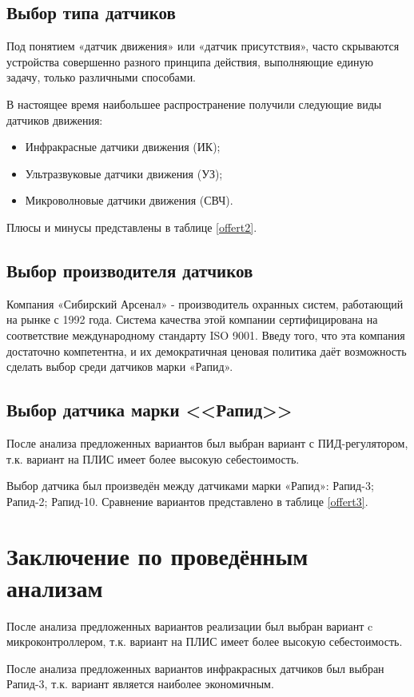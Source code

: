 		\subsection{Выбор типа датчиков}
			Под понятием «датчик движения» или «датчик присутствия», часто скрываются устройства совершенно разного принципа действия, выполняющие единую задачу, только различными способами.

			В настоящее время наибольшее распространение получили следующие виды датчиков движения:
			\begin{itemize}
\changefontsizes[14pt]{14pt}
				\item Инфракрасные датчики движения (ИК);
				\item Ультразвуковые датчики движения (УЗ);
				\item Микроволновые датчики движения (СВЧ).
			\end{itemize}
			Плюсы и минусы представлены в таблице \ref{offert2}.
			
		\subsection{Выбор производителя датчиков}
			Компания «Сибирский Арсенал» - производитель охранных систем, работающий на рынке с 1992 года. Система качества этой компании сертифицирована на соответствие международному стандарту ISO 9001.
			Введу того, что эта компания достаточно компетентна, и их демократичная ценовая политика даёт возможность сделать выбор среди датчиков марки «Рапид».
		\subsection{Выбор датчика марки <<Рапид>>}
			После анализа предложенных вариантов был выбран вариант с ПИД-регулятором, т.к. вариант на ПЛИС имеет более высокую себестоимость.

			Выбор датчика был произведён между датчиками марки «Рапид»: Рапид-3; Рапид-2; Рапид-10. Сравнение вариантов представлено в таблице \ref{offert3}.
			
	\section{Заключение по проведённым анализам}
		После анализа предложенных вариантов реализации был выбран вариант c микроконтроллером, т.к. вариант на ПЛИС имеет более высокую себестоимость.

		После анализа предложенных вариантов инфракрасных датчиков был выбран  Рапид-3, т.к. вариант является наиболее экономичным.
